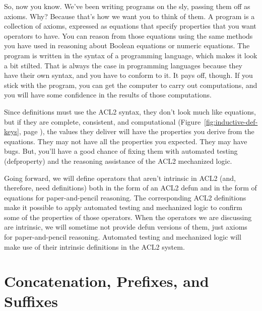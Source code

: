 So, now you 
know.
We've been writing programs on the sly, passing them off as axioms.
Why? Because that's how we want you to think of them.
A program is a collection of axioms, expressed as equations
that specify properties that you want operators to have.
You can reason from those equations using the same methods
you have used in reasoning about Boolean equations or numeric equations.
The program is written in the syntax of a programming language,
which makes it look a bit stilted.
That is always the case in programming languages because
they have their own syntax, and you have to conform to it.
It pays off, though.
If you stick with the program, you can get the computer to carry out
computations, and you will have some confidence in the results
of those computations.

Since definitions must use the ACL2 syntax,
they don't look much like equations, %
but if they are complete, consistent, and computational
(Figure~\ref{fig:inductive-def-keys}, page \pageref{fig:inductive-def-keys}),
the values they deliver will have the properties you derive
from the equations.
They may not have all the properties you expected.
They may have bugs.
But, you'll have a good chance of fixing them with %
automated testing (\textsf{defproperty})
and the reasoning assistance of the ACL2 mechanized logic.

Going forward, we will define operators that aren't %
intrinsic in ACL2 (and, therefore, need definitions)
both in the form of an ACL2 \textsf{defun}
and in the form of equations for paper-and-pencil reasoning.
The corresponding ACL2 definitions
make it possible to apply automated testing and mechanized logic
to confirm some of the properties of those operators.
When the operators we are discussing are intrinsic,
we will sometime not provide \textsf{defun} versions of them,
just axioms for paper-and-pencil reasoning.
Automated testing and mechanized logic will make use
of their intrinsic definitions in the ACL2 system.

\section{Concatenation, Prefixes, and Suffixes}
\label{sec:append-prefix-suffix}

